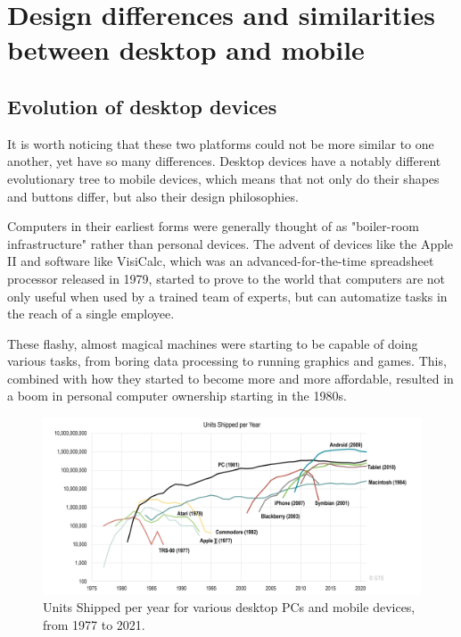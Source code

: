 \section{Design differences and similarities between desktop and mobile}

\subsection{Evolution of desktop devices}

It is worth noticing that these two platforms could not be more similar to one another, yet have so many differences. Desktop devices have a notably different evolutionary tree to mobile devices, which means that not only do their shapes and buttons differ, but also their design philosophies.

Computers in their earliest forms were generally thought of as "boiler-room infrastructure" rather than personal devices. The advent of devices like the Apple II and software like VisiCalc, which was an advanced-for-the-time spreadsheet processor released in 1979, started to prove to the world that computers are not only useful when used by a trained team of experts, but can automatize tasks in the reach of a single employee. \cite{NYBirthPC}

These flashy, almost magical machines were starting to be capable of doing various tasks, from boring data processing to running graphics and games. This, combined with how they started to become more and more affordable, resulted in a boom in personal computer ownership starting in the 1980s.

\begin{figure}[htbp]
    \centering
    \includegraphics[width=\textwidth]{./figures/historical_pc_usage.png}
    \caption{Units Shipped per year for various desktop PCs and mobile devices, from 1977 to 2021. \cite{TGPCHis}}
    \label{FigHistoricalPC}
\end{figure}

